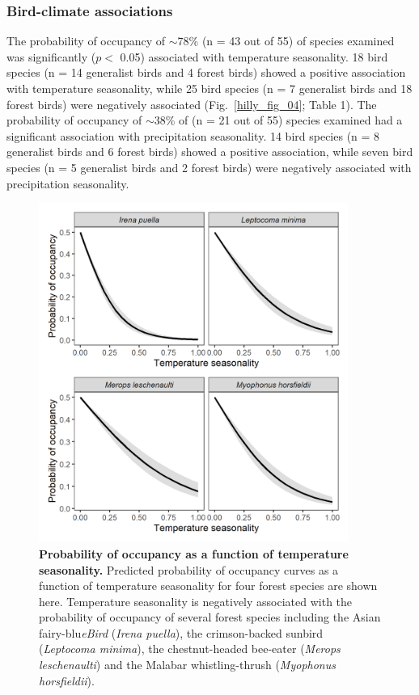\subsubsection*{Bird-climate associations}

The probability of occupancy of $\sim$78\% (n = 43 out of 55) of species examined was significantly ($p <$ 0.05) associated with temperature seasonality.
18 bird species (n = 14 generalist birds and 4 forest birds) showed a positive association with temperature seasonality, while 25 bird species (n = 7 generalist birds and 18 forest birds) were negatively associated (Fig.~\ref{hilly_fig_04}; Table 1).
The probability of occupancy of $\sim$38\% of (n = 21 out of 55) species examined had a significant association with precipitation seasonality.
14 bird species (n = 8 generalist birds and 6 forest birds) showed a positive association, while seven bird species (n = 5 generalist birds and 2 forest birds) were negatively associated with precipitation seasonality.

\begin{figure}[h!]
    \centering
    \includegraphics[width=0.9\textwidth]{figures/hillybirds/fig_05.png}
    \caption{
        \textbf{Probability of occupancy as a function of temperature seasonality.}
        Predicted probability of occupancy curves as a function of temperature seasonality for four forest species are shown here. 
        Temperature seasonality is negatively associated with the probability of occupancy of several forest species including the Asian fairy-blu\textit{eBird} (\textit{Irena puella}), the crimson-backed sunbird (\textit{Leptocoma minima}), the chestnut-headed bee-eater (\textit{Merops leschenaulti}) and the Malabar whistling-thrush (\textit{Myophonus horsfieldii}).
    }
    \label{hilly_fig_05}
\end{figure}

